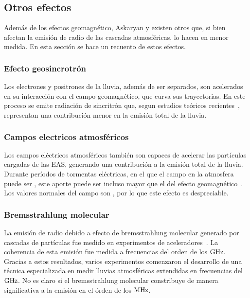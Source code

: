 \subsection{Otros efectos}
\label{sbsc:other_emision}
	
	Adem\'as de los efectos geomagn\'etico, Askaryan y \cher{} existen otros que, si bien afectan la emisi\'on de radio de las cascadas atmosf\'ericas, lo hacen en menor medida. 
	En esta secci\'on se hace un recuento de estos efectos.
	
	\subsubsection{Efecto geosincrotr\'on}
	Los electrones y positrones de la lluvia, adem\'as de ser separados, son acelerados en su interacci\'on con el campo geomagn\'etico, que curva sus trayectorias.
	En este proceso se emite radiaci\'on de sincritr\'on que, segun estudios te\'oricos recientes~\cite{geosintrotron}, representan una contribuci\'on menor en la emisi\'on total de la lluvia.
	
	\subsubsection{Campos electricos atmosf\'ericos}
	Los campos el\'ectricos atmosf\'ericos tambi\'en son capaces de acelerar las part\'iculas cargadas de las EAS, generando una contribuci\'on a la emisi\'on total de la lluvia.
	Durante per\'iodos de tormentas el\'ectricas, en el que el campo en la atmosfera puede ser , este aporte puede ser incluso mayor que el del efecto geomagn\'etico~\cite{atmosphericField}.
	Los valores normales del campo son , por lo que este efecto es despreciable.
	
	\subsubsection{Bremsstrahlung molecular}
	
	La emisi\'on de radio debido a efecto de bremsstrahlung molecular generado por cascadas de part\'iculas fue medido en experimentos de aceleradores~\cite{bremsstrahlungMolec}. La coherencia de esta emisi\'on fue medida a frecuencias del orden de los $\rm GHz$.
	Gracias a estos resultados, varios experimentos comenzaron el desarrollo de una t\'ecnica especializada en medir lluvias atmosf\'ericas extendidas en frecuencias del $\rm GHz$.
	No es claro si el bremsstrahlung molecular constribuye de manera significativa a la emisi\'on en el \'orden de los $\rm MHz$.
	
